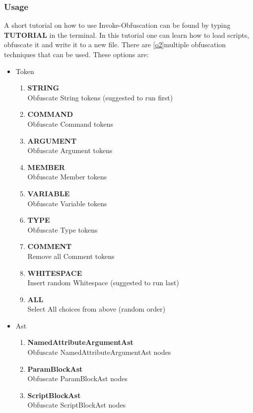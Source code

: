 \documentclass{article}%
\begin{document}
\subsubsection{Usage}
A short tutorial on how to use Invoke-Obfuscation can be found by typing \textbf{TUTORIAL} in the terminal. In this tutorial one can learn how to load scripts, obfuscate it and write it to a new file. There are [\hyperlink{o2}{o2}]multiple obfuscation techniques that can be used. These options are:
\begin{itemize}
	\item Token
	\begin{enumerate}
		\item \textbf{STRING}        
		\\Obfuscate String tokens (suggested to run first)
		\item \textbf{COMMAND}       
		\\Obfuscate Command tokens
		\item \textbf{ARGUMENT}      
		\\Obfuscate Argument tokens
		\item \textbf{MEMBER}        
		\\Obfuscate Member tokens
		\item \textbf{VARIABLE}      
		\\Obfuscate Variable tokens
		\item \textbf{TYPE}          
		\\Obfuscate Type tokens
		\item \textbf{COMMENT}       
		\\Remove all Comment tokens
		\item \textbf{WHITESPACE}    
		\\Insert random Whitespace (suggested to run last)
		\item \textbf{ALL}           
		\\Select All choices from above (random order)
	\end{enumerate}
	\item Ast
	\begin{enumerate}
		\item \textbf{NamedAttributeArgumentAst}  
			\\Obfuscate NamedAttributeArgumentAst nodes
		\item \textbf{ParamBlockAst}              
			\\Obfuscate ParamBlockAst nodes
		\item \textbf{ScriptBlockAst}             
			\\Obfuscate ScriptBlockAst nodes

\end{enumerate}
\end{itemize}
\end{document}

